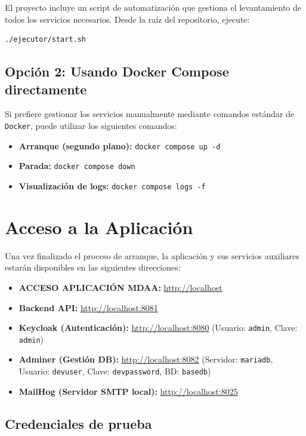El proyecto incluye un script de automatización que gestiona el levantamiento de todos los servicios necesarios. Desde la raíz del repositorio, ejecute:

\begin{lstlisting}[language=bash]
./ejecutor/start.sh
\end{lstlisting}

\subsection{Opción 2: Usando Docker Compose directamente}

Si prefiere gestionar los servicios manualmente mediante comandos estándar de \texttt{Docker}, puede utilizar los siguientes comandos:

\begin{itemize}
    \item \textbf{Arranque (segundo plano):} \texttt{docker compose up -d}
    \item \textbf{Parada:} \texttt{docker compose down}
    \item \textbf{Visualización de logs:} \texttt{docker compose logs -f}
\end{itemize}

\section{Acceso a la Aplicación}

Una vez finalizado el proceso de arranque, la aplicación y sus servicios auxiliares estarán disponibles en las siguientes direcciones:

\begin{itemize}
    \item \textbf{ACCESO APLICACIÓN MDAA:} \url{http://localhost}
    \item \textbf{Backend API:} \url{http://localhost:8081}
    \item \textbf{Keycloak (Autenticación):} \url{http://localhost:8080} (Usuario: \texttt{admin}, Clave: \texttt{admin})
    \item \textbf{Adminer (Gestión DB):} \url{http://localhost:8082} (Servidor: \texttt{mariadb}, Usuario: \texttt{devuser}, Clave: \texttt{devpassword}, BD: \texttt{basedb})
    \item \textbf{MailHog (Servidor SMTP local):} \url{http://localhost:8025}
\end{itemize}

\subsection{Credenciales de prueba}

